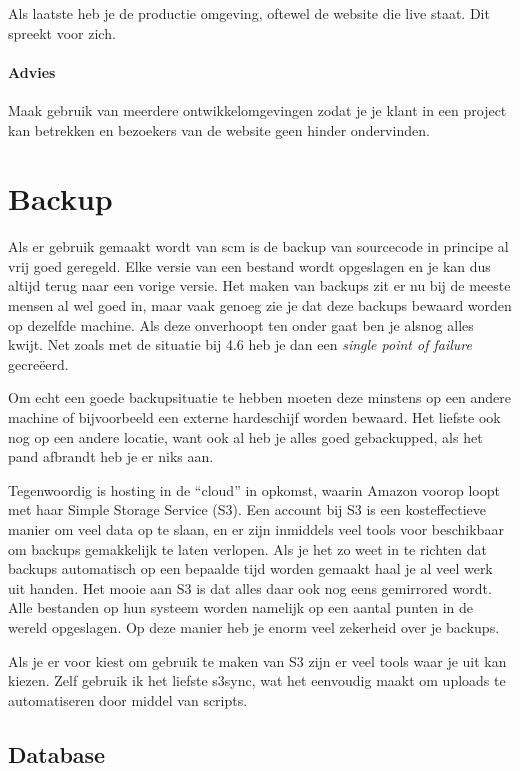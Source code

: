 Als laatste heb je de productie omgeving, oftewel de website die live staat. Dit spreekt voor zich.

\paragraph{Advies} Maak gebruik van meerdere ontwikkelomgevingen zodat je je klant in een project kan betrekken en bezoekers van de website geen hinder ondervinden.

\section{Backup}

Als er gebruik gemaakt wordt van {\sc scm} is de backup van sourcecode in principe al vrij goed geregeld. Elke versie van een bestand wordt opgeslagen en je kan dus altijd terug naar een vorige versie. Het maken van backups zit er nu bij de meeste mensen al wel goed in, maar vaak genoeg zie je dat deze backups bewaard worden op dezelfde machine. Als deze onverhoopt ten onder gaat ben je alsnog alles kwijt. Net zoals met de situatie bij 4.6 heb je dan een \emph{single point of failure} gecreëerd.

Om echt een goede backupsituatie te hebben moeten deze minstens op een andere machine of bijvoorbeeld een externe hardeschijf worden bewaard. Het liefste ook nog op een andere locatie, want ook al heb je alles goed gebackupped, als het pand afbrandt heb je er niks aan.

Tegenwoordig is hosting in de ``cloud'' in opkomst, waarin Amazon voorop loopt met haar Simple Storage Service (S3). Een account bij S3 is een kosteffectieve manier om veel data op te slaan, en er zijn inmiddels veel tools voor beschikbaar om backups gemakkelijk te laten verlopen. Als je het zo weet in te richten dat backups automatisch op een bepaalde tijd worden gemaakt haal je al veel werk uit handen. Het mooie aan S3 is dat alles daar ook nog eens gemirrored wordt. Alle bestanden op hun systeem worden namelijk op een aantal punten in de wereld opgeslagen. Op deze manier heb je enorm veel zekerheid over je backups.

Als je er voor kiest om gebruik te maken van S3 zijn er veel tools waar je uit kan kiezen.\cite{amazontools} Zelf gebruik ik het liefste s3sync\cite{s3sync}, wat het eenvoudig maakt om uploads te automatiseren door middel van scripts.

\subsection{Database}

